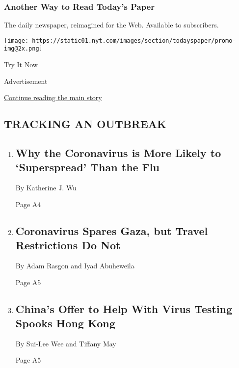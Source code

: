 \href{http://app.nytimes.com/todayspaper}{}

\hypertarget{another-way-to-read-todays-paper}{%
\subsubsection{Another Way to Read Today's
Paper}\label{another-way-to-read-todays-paper}}

The daily newspaper, reimagined for the Web. Available to subscribers.

\texttt{[image: https://static01.nyt.com/images/section/todayspaper/promo-img@2x.png]}

Try It Now

Advertisement

\protect\hyperlink{after-mid1}{Continue reading the main story}

\hypertarget{tracking-an-outbreak}{%
\subsection{TRACKING AN OUTBREAK}\label{tracking-an-outbreak}}

\begin{enumerate}
\def\labelenumi{\arabic{enumi}.}
\item
  \href{/2020/08/07/health/coronavirus-superspreading-contagion.html}{}

  \hypertarget{why-the-coronavirus-is-more-likely-to-superspread-than-the-flu}{%
  \subsection{Why the Coronavirus is More Likely to `Superspread' Than
  the
  Flu}\label{why-the-coronavirus-is-more-likely-to-superspread-than-the-flu}}

  By Katherine J. Wu

  Page A4
\item
  \href{/2020/08/08/world/middleeast/coronavirus-gaza.html}{}

  \hypertarget{coronavirus-spares-gaza-but-travel-restrictions-do-not-1}{%
  \subsection{Coronavirus Spares Gaza, but Travel Restrictions Do
  Not}\label{coronavirus-spares-gaza-but-travel-restrictions-do-not-1}}

  By Adam Rasgon and Iyad Abuheweila

  Page A5
\item
  \href{/2020/08/06/business/hong-kong-china-coronavirus-testing.html}{}

  \hypertarget{chinas-offer-to-help-with-virus-testing-spooks-hong-kong}{%
  \subsection{China's Offer to Help With Virus Testing Spooks Hong
  Kong}\label{chinas-offer-to-help-with-virus-testing-spooks-hong-kong}}

  By Sui-Lee Wee and Tiffany May

  Page A5
\end{enumerate}

